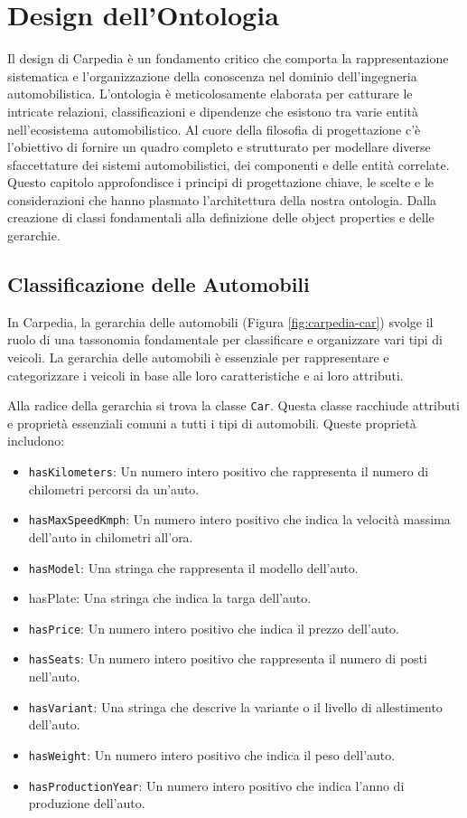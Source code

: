 \chapter{Design dell'Ontologia}

Il design di Carpedia è un fondamento critico che comporta la rappresentazione sistematica e l'organizzazione della conoscenza nel dominio dell'ingegneria automobilistica. L'ontologia è meticolosamente elaborata per catturare le intricate relazioni, classificazioni e dipendenze che esistono tra varie entità nell'ecosistema automobilistico. Al cuore della filosofia di progettazione c'è l'obiettivo di fornire un quadro completo e strutturato per modellare diverse sfaccettature dei sistemi automobilistici, dei componenti e delle entità correlate. Questo capitolo approfondisce i principi di progettazione chiave, le scelte e le considerazioni che hanno plasmato l'architettura della nostra ontologia. Dalla creazione di classi fondamentali alla definizione delle object properties e delle gerarchie.

\section{Classificazione delle Automobili}

In Carpedia, la gerarchia delle automobili (Figura \ref{fig:carpedia-car}) svolge il ruolo di una tassonomia fondamentale per classificare e organizzare vari tipi di veicoli. La gerarchia delle automobili è essenziale per rappresentare e categorizzare i veicoli in base alle loro caratteristiche e ai loro attributi.

Alla radice della gerarchia si trova la classe \texttt{Car}. Questa classe racchiude attributi e proprietà essenziali comuni a tutti i tipi di automobili. Queste proprietà includono:

\begin{itemize}
    \item \texttt{hasKilometers}: Un numero intero positivo che rappresenta il numero di chilometri percorsi da un'auto.
    \item \texttt{hasMaxSpeedKmph}: Un numero intero positivo che indica la velocità massima dell'auto in chilometri all'ora.
    \item \texttt{hasModel}: Una stringa che rappresenta il modello dell'auto.
    \item hasPlate: Una stringa che indica la targa dell'auto.
    \item \texttt{hasPrice}: Un numero intero positivo che indica il prezzo dell'auto.
    \item \texttt{hasSeats}: Un numero intero positivo che rappresenta il numero di posti nell'auto.
    \item \texttt{hasVariant}: Una stringa che descrive la variante o il livello di allestimento dell'auto.
    \item \texttt{hasWeight}: Un numero intero positivo che indica il peso dell'auto.
    \item \texttt{hasProductionYear}: Un numero intero positivo che indica l'anno di produzione dell'auto.
\end{itemize}

